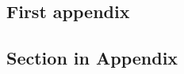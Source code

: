 \printbibliography[title={References},heading=bibintoc] %



\begin{uomappendix} 
  \chapter{First appendix}
    \section{Section in Appendix}
    \lipsum[1-6]
\end{uomappendix}


